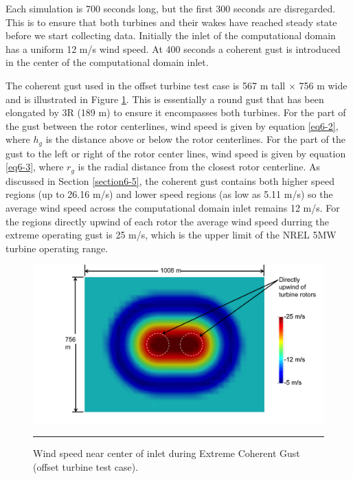 Each simulation is 700 seconds long, but the first 300 seconds are disregarded. This is to ensure that both turbines and their wakes have reached steady state before we start collecting data. Initially the inlet of the computational domain has a uniform 12 m/s wind speed. At 400 seconds a coherent gust is introduced in the center of the computational domain inlet. 

The coherent gust used in the offset turbine test case is 567 m tall $\times$ 756 m wide and is illustrated in Figure \ref{fig6-13}. This is essentially a round gust that has been elongated by 3R (189 m) to ensure it encompasses both turbines. For the part of the gust between the rotor centerlines,  wind speed is given by equation \ref{eq6-2}, where $h_g$ is the distance above or below the rotor centerlines. For the part of the gust to the left or right of the rotor center lines, wind speed is given by equation \ref{eq6-3}, where $r_g$ is the radial distance from the closest rotor centerline. As discussed in Section \ref{section6-5}, the coherent gust contains both higher speed regions (up to 26.16 m/s) and lower speed regions (as low as 5.11 m/s) so the average wind speed across the computational domain inlet remains 12 m/s. For the regions directly upwind of each rotor the average wind speed durring the extreme operating gust is 25 m/s, which is the upper limit of the NREL 5MW turbine operating range. 

\begin{figure}[htbp] \label{fig6-13} 
	\centering
		\includegraphics[width = \linewidth]{Figures/ch6Figures/fig6-13.png}
		\rule{35em}{0.5pt}
	\caption{Wind speed near center of inlet during Extreme Coherent Gust (offset turbine test case).}
\end{figure}

